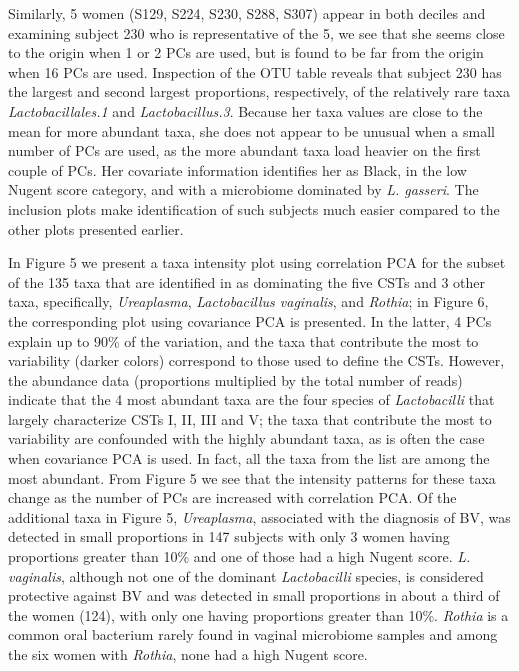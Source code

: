 \documentclass[doublespacing]{bmcart}
\def\texttt{[image: ]}
\begin{document}


Similarly, 5 women (S129, S224, S230, S288, S307) appear in both deciles and examining subject 230 who is representative of the 5, we see that she seems close to the origin when 1 or 2 PCs are used, but is found to be far from the origin when 16 PCs are used.  Inspection of the OTU table reveals that subject 230 has the largest and second largest proportions, respectively, of the relatively rare taxa \textit{Lactobacillales.1} and  \textit{Lactobacillus.3}.  Because her taxa values are close to the mean for more abundant taxa, she does not appear to be unusual when a small number of PCs are used, as the more abundant taxa load heavier on the first couple of PCs.  Her covariate information identifies her as Black, in the low Nugent score category, and with a microbiome dominated by \textit{L. gasseri}. The inclusion plots make identification of such subjects much easier compared to the other plots presented earlier.

In Figure 5 we present a taxa intensity plot using correlation PCA for the subset of the 135 taxa that are identified in \cite{Ravel} as dominating the five CSTs and 3 other taxa, specifically, \textit{Ureaplasma}, \textit{Lactobacillus vaginalis}, and \textit{Rothia}; in Figure 6, the corresponding plot using covariance PCA is presented. In the latter, 4 PCs explain up to $90\%$ of the variation,  and the taxa that contribute the most to variability (darker colors) correspond to those used to define the CSTs. However, the abundance data (proportions multiplied by the total number of reads) indicate that the 4 most abundant taxa are the four species of \textit{Lactobacilli} that largely characterize CSTs I, II, III and V; the taxa that contribute the most to variability are confounded with the highly abundant taxa, as is often the case when covariance PCA is used. In fact, all the taxa from the list are among the most abundant. From Figure 5 we see that the intensity patterns for these taxa change as the number of PCs are increased with correlation PCA. 
Of the additional taxa in Figure 5,  \textit{Ureaplasma}, associated with the diagnosis of BV, was detected in small proportions in 147 subjects with only 3 women having proportions greater than 10\% and one of those had a high Nugent score.  \textit{L. vaginalis}, although not one of the dominant \textit{Lactobacilli} species, is considered protective against BV and was detected in small proportions in about a third of the women (124), with only one having proportions greater than 10\%. \textit{Rothia} is a common oral bacterium rarely found in vaginal microbiome samples and among the six women with \textit{Rothia}, none had a high Nugent score.
\end{document}
